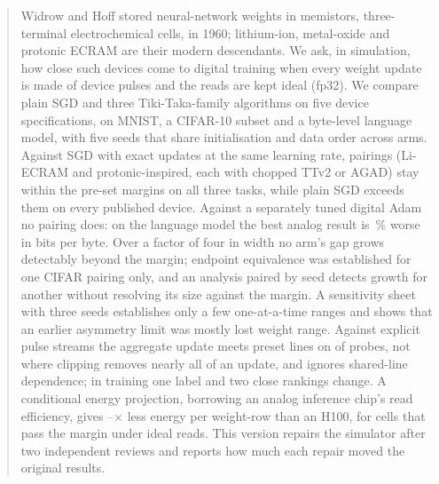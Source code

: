 \begin{abstract}
Widrow and Hoff stored neural-network weights in memistors, three-terminal electrochemical cells, in 1960; lithium-ion,
metal-oxide and protonic ECRAM are their modern descendants. We ask, in simulation, how close such devices come to digital
training when every weight update is made of device pulses and the reads are kept ideal (fp32). We compare plain SGD and three
Tiki-Taka-family algorithms on five device specifications, on MNIST, a CIFAR-10 subset and a byte-level language model, with five
seeds that share initialisation and data order across arms. Against SGD with exact updates at the same learning rate,
\RVAllThreeFpN{} pairings (Li-ECRAM and protonic-inspired, each with chopped TTv2 or AGAD) stay within the pre-set margins on all
three tasks, while plain SGD exceeds them on every published device. Against a separately tuned digital Adam no pairing does: on
the language model the best analog result is \RVLmAdamBestGap\,\% worse in bits per byte. Over a factor of four in width no
arm's gap grows detectably beyond the margin; endpoint equivalence was established for one CIFAR pairing only, and an analysis
paired by seed detects growth for another without resolving its size against the margin. A sensitivity sheet with three seeds establishes only a few one-at-a-time
ranges and shows that an earlier asymmetry limit was mostly lost weight range. Against explicit pulse streams the aggregate
update meets preset lines on \RYProbeSurMeetsN{} of \RYProbeN{} probes, not where clipping removes nearly all of an
update, and ignores shared-line dependence; in training one label and two close rankings change. A conditional energy projection, borrowing an analog inference chip's read efficiency, gives
\RVenSysMin--\RVenChipMax$\times$ less energy per weight-row than an H100, for cells that pass the margin under ideal reads. This
version repairs the simulator after two independent reviews and reports how much each repair moved the original results.
\end{abstract}
